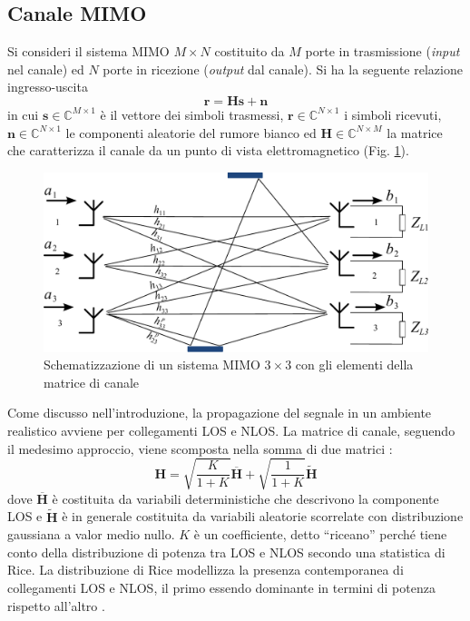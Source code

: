\documentclass[technote]{IEEEtran}
\newcommand{\mat}[1]{\mathbf{#1}}
\begin{document}
\subsection{Canale MIMO}

\par Si consideri il sistema MIMO $M \times N$ costituito da $M$ porte in trasmissione (\textit{input} nel canale) ed $N$ porte in ricezione (\textit{output} dal canale). Si ha la seguente relazione ingresso-uscita $$\mathbf{r} = \mathbf{H} \mathbf{s} + \mathbf{n}$$ in cui $\mathbf{s} \in \mathbb{C}^{M \times 1}$ è il vettore dei simboli trasmessi, $\mathbf{r} \in \mathbb{C}^{N \times 1}$ i simboli ricevuti, $\mathbf{n} \in \mathbb{C}^{N \times 1}$ le componenti aleatorie del rumore bianco ed $\mathbf{H} \in \mathbb{C}^{N \times M}$ la matrice che caratterizza il canale da un punto di vista elettromagnetico (Fig. \ref{fig:5}).
\begin{figure}[!ht]
\centering
\includegraphics[width=\columnwidth]{figure5}
\caption{Schematizzazione di un sistema MIMO $3 \times 3$ con gli elementi della matrice di canale}
\label{fig:5}
\end{figure}

\par Come discusso nell'introduzione, la propagazione del segnale in un ambiente realistico avviene per collegamenti LOS e NLOS. La matrice di canale, seguendo il medesimo approccio, viene scomposta nella somma di due matrici \cite{Sarris2007}: $$\mat{H} = \sqrt{\frac{K}{1+K}} \overline{\mat{H}} + \sqrt{\frac{1}{1+K}} \widetilde{\mat{H}} $$
dove $\overline{\mat{H}}$ è costituita da variabili deterministiche che descrivono la componente LOS e $\widetilde{\mat{H}}$ è in generale costituita da variabili aleatorie scorrelate con distribuzione gaussiana a valor medio nullo. $K$ è un coefficiente, detto ``riceano'' perché tiene conto della distribuzione di potenza tra LOS e NLOS secondo una statistica di Rice. La distribuzione di Rice modellizza la presenza contemporanea di collegamenti LOS e NLOS, il primo essendo dominante in termini di potenza rispetto all'altro \cite{Lindsey}.
\end{document}
